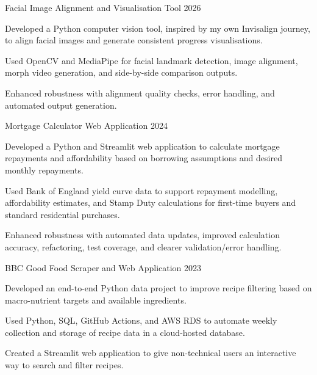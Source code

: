 \begin{cventries}
  \cvproject
  {Facial Image Alignment and Visualisation Tool}
  {2026}
  {
    \begin{cvitems}
      \item {Developed a Python computer vision tool, inspired by my own Invisalign journey, to align facial images and generate consistent progress visualisations.}
      \item {Used OpenCV and MediaPipe for facial landmark detection, image alignment, morph video generation, and side-by-side comparison outputs.}
      \item {Enhanced robustness with alignment quality checks, error handling, and automated output generation.}
    \end{cvitems}
  }

  \cvproject
  {Mortgage Calculator Web Application}
  {2024}
  {
    \begin{cvitems}
      \item {Developed a Python and Streamlit web application to calculate mortgage repayments and affordability based on borrowing assumptions and desired monthly repayments.}
      \item {Used Bank of England yield curve data to support repayment modelling, affordability estimates, and Stamp Duty calculations for first-time buyers and standard residential purchases.}
      \item {Enhanced robustness with automated data updates, improved calculation accuracy, refactoring, test coverage, and clearer validation/error handling.}
    \end{cvitems}
  }

  \cvproject
  {BBC Good Food Scraper and Web Application}
  {2023}
  {
    \begin{cvitems}
      \item {Developed an end-to-end Python data project to improve recipe filtering based on macro-nutrient targets and available ingredients.}
      \item {Used Python, SQL, GitHub Actions, and AWS RDS to automate weekly collection and storage of recipe data in a cloud-hosted database.}
      \item {Created a Streamlit web application to give non-technical users an interactive way to search and filter recipes.}
    \end{cvitems}
  }
\end{cventries}

